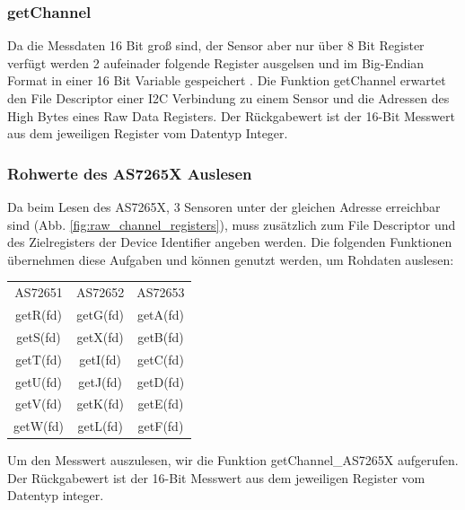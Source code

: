 \subsubsection{getChannel}
Da die Messdaten 16 Bit groß sind, der Sensor aber nur über 8 Bit Register verfügt werden 2 aufeinader folgende Register ausgelsen und im Big-Endian Format in einer 16 Bit Variable gespeichert .
Die Funktion getChannel erwartet den File Descriptor einer I2C Verbindung zu einem Sensor und die Adressen des High Bytes eines Raw Data Registers.
Der Rückgabewert ist der 16-Bit Messwert aus dem jeweiligen Register vom Datentyp Integer.\\



\subsubsection{Rohwerte des AS7265X Auslesen}
Da beim Lesen des AS7265X, 3 Sensoren unter der gleichen Adresse erreichbar sind (Abb. \ref{fig:raw_channel_registers}), muss zusätzlich zum File Descriptor und des Zielregisters der Device Identifier angeben werden.
Die folgenden Funktionen übernehmen diese Aufgaben und können genutzt werden, um Rohdaten auslesen:
\begin{center}
\begin{tabular}{ c c c }
 	AS72651 & AS72652 & AS72653 \\ 
 	getR(fd) & getG(fd) & getA(fd) \\  
 	getS(fd) & getX(fd) & getB(fd) \\
 	getT(fd) & getI(fd) & getC(fd) \\  
 	getU(fd) & getJ(fd) & getD(fd) \\
 	getV(fd) & getK(fd) & getE(fd) \\  
 	getW(fd) & getL(fd) & getF(fd) \\
\end{tabular}
\end{center}
Um den Messwert auszulesen, wir die Funktion getChannel\_AS7265X aufgerufen.\\
Der Rückgabewert ist der 16-Bit Messwert aus dem jeweiligen Register vom Datentyp integer.\\

%

